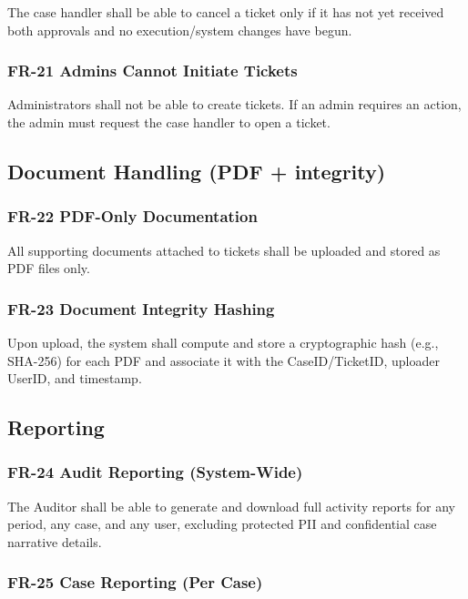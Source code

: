 \documentclass[12pt,a4paper]{report}
\begin{document}
The case handler shall be able to cancel a ticket only if it has not yet received both approvals and no execution/system changes have begun.

\subsubsection{FR-21 Admins Cannot Initiate Tickets}

Administrators shall not be able to create tickets. If an admin requires an action, the admin must request the case handler to open a ticket.


\subsection{Document Handling (PDF + integrity)}

\subsubsection{FR-22 PDF-Only Documentation}

All supporting documents attached to tickets shall be uploaded and stored as PDF files only.

\subsubsection{FR-23 Document Integrity Hashing}

Upon upload, the system shall compute and store a cryptographic hash (e.g., SHA-256) for each PDF and associate it with the CaseID/TicketID, uploader UserID, and timestamp.


\subsection{Reporting}

\subsubsection{FR-24 Audit Reporting (System-Wide)}

The Auditor shall be able to generate and download full activity reports for any period, any case, and any user, excluding protected PII and confidential case narrative details.

\subsubsection{FR-25 Case Reporting (Per Case)}
\end{document}
